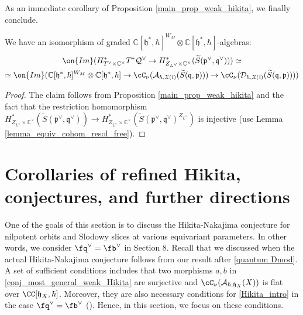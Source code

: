 \documentclass[12pt]{amsart}
\begin{document}
As an immediate corollary of Proposition \ref{main_prop_weak_hikita}, we finally conclude.
\begin{theorem}\label{main_th_weak_hikita}
We have an isomorphism of graded $\mathbb{C}[\mathfrak{h}^*,\hbar]^{W_M} \otimes \mathbb{C}[\mathfrak{h}^*,\hbar]$-algebras:
\begin{multline*}
\on{Im}(H^*_{T^\vee \times \mathbb{C}^\times}T^*\mathcal{Q}^\vee \rightarrow H^*_{Z_{L^\vee} \times \mathbb{C}^\times}(\widetilde{S}(\mathfrak{p}^\vee,\mathfrak{q}^\vee))) \simeq \\
\simeq \on{Im}(\mathbb{C}[\mathfrak{h}^*,\hbar]^{W_M} \otimes \mathbb{C}[\mathfrak{h}^*,\hbar] \rightarrow \cC_\nu(\mathcal{A}_{\hbar,\mathfrak{X}(\mathfrak{l})}(\widetilde{S}(\mathfrak{q},\mathfrak{p}))) \rightarrow \cC_\nu(\mathcal{D}_{\hbar,\mathfrak{X}(\mathfrak{l})}(\widetilde{S}(\mathfrak{q},\mathfrak{p}))))
\end{multline*}
\end{theorem}
\begin{proof}
The claim follows from Proposition \ref{main_prop_weak_hikita} and the fact that the restriction homomorphism $H^*_{Z_{L^\vee} \times \mathbb{C}^\times}(\widetilde{S}(\mathfrak{p}^\vee,\mathfrak{q}^\vee)) \rightarrow H^*_{Z_{L^\vee} \times \mathbb{C}^\times}(\widetilde{S}(\mathfrak{p}^\vee,\mathfrak{q}^\vee)^{Z_{L^\vee}})$ is injective (use Lemma \ref{lemma_equiv_cohom_resol_free}).
\end{proof}




\section{Corollaries of refined Hikita, conjectures, and further directions}\label{sec_cor_conj_further}
One of the goals of this section is to discuss the Hikita-Nakajima conjecture for nilpotent orbits and Slodowy slices at various equivariant parameters. In other words, we consider $\fq^\vee= \fb^\vee$ in Section 8. Recall that we discussed when the actual Hikita-Nakajima conjecture follows from our result after \cref{quantum Dmod}. A set of sufficient conditions includes that two morphisms $a,b$ in \cref{conj_most_general_weak_Hikita} are surjective and $\cC_\nu(\mathcal{A}_{\hbar,\mathfrak{h}_X}(X))$ is flat over $\CC[\mathfrak{h}_{X},\hbar]$. Moreover, they are also necessary conditions for \cref{Hikita_intro} in the case $\fq^\vee= \fb^\vee$ (\cite[Proposition 1.5]{hoang2}). Hence, in this section, we focus on these conditions.
\end{document}
